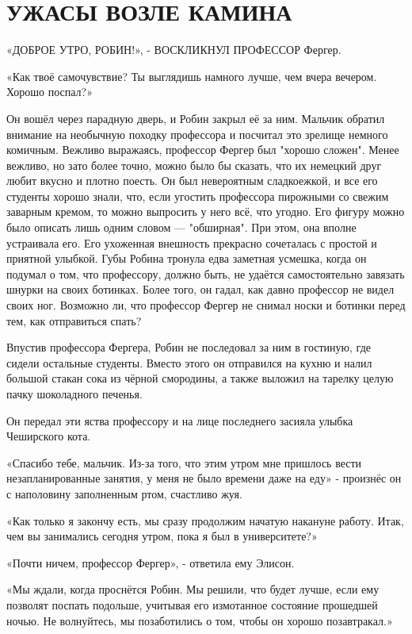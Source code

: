 \documentclass[a4paper,12pt]{book}
\begin{document}
\chapter{УЖАСЫ ВОЗЛЕ КАМИНА}
\noindent\par«ДОБРОЕ УТРО, РОБИН!», - ВОСКЛИКНУЛ ПРОФЕССОР Фергер.
\par
«Как твоё самочувствие? Ты выглядишь намного лучше, чем вчера вечером. Хорошо поспал?»
\par
Он вошёл через парадную дверь, и Робин закрыл её за ним. Мальчик обратил внимание на необычную походку профессора и посчитал это зрелище немного комичным. Вежливо выражаясь, профессор Фергер был "хорошо сложен". Менее вежливо, но зато более точно, можно было бы сказать, что их немецкий друг любит вкусно и плотно поесть. Он был невероятным сладкоежкой, и все его студенты хорошо знали, что, если угостить профессора пирожными со свежим заварным кремом, то можно выпросить у него всё, что угодно. Его фигуру можно было описать лишь одним словом — "обширная". При этом, она вполне устраивала его. Его ухоженная внешность прекрасно сочеталась с простой и приятной улыбкой. Губы Робина тронула едва заметная усмешка, когда он подумал о том, что профессору, должно быть, не удаётся самостоятельно завязать шнурки на своих ботинках. Более того, он гадал, как давно профессор не видел своих ног. Возможно ли, что профессор Фергер не снимал носки и ботинки перед тем, как отправиться спать?\\
\par
Впустив профессора Фергера, Робин не последовал за ним в гостиную, где сидели остальные студенты. Вместо этого он отправился на кухню и налил большой стакан сока из чёрной смородины, а также выложил на тарелку целую пачку шоколадного печенья.
\par
Он передал эти яства профессору и на лице последнего засияла улыбка Чеширского кота.
\par
«Спасибо тебе, мальчик. Из-за того, что этим утром мне пришлось вести незапланированные занятия, у меня не было времени даже на еду» - произнёс он с наполовину заполненным ртом, счастливо жуя.
\par
«Как только я закончу есть, мы сразу продолжим начатую накануне работу. Итак, чем вы занимались сегодня утром, пока я был в университете?»
\par
«Почти ничем, профессор Фергер», - ответила ему Элисон.
\par
«Мы ждали, когда проснётся Робин. Мы решили, что будет лучше, если ему позволят поспать подольше, учитывая его измотанное состояние прошедшей ночью. Не волнуйтесь, мы позаботились о том, чтобы он хорошо позавтракал.»
\end{document}
